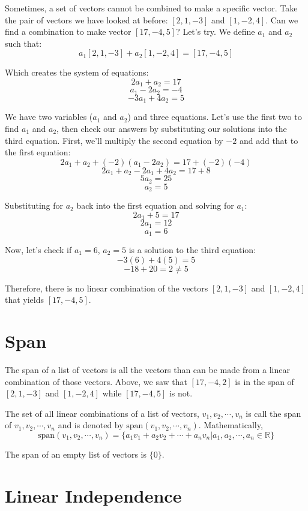 Sometimes, a set of vectors cannot be combined to make a specific vector. Take 
the pair of vectors we have looked at before: $\left[ 2, 1, -3 \right]$ and 
$\left[ 1, -2, 4 \right]$. Can we find a combination to make vector $\left[ 
17, -4, 5 \right]$? Let's try. We define $a_1$ and $a_2$ such that:
$$a_1 \left[ 2, 1, -3 \right] + a_2 \left[ 1, -2, 4 \right] = \left[ 17, -4, 5 
\right]$$

Which creates the system of equations:
$$2 a_1 + a_2 = 17$$
$$a_1 - 2 a_2 = -4$$
$$-3 a_1 + 4 a_2 = 5$$

We have two variables ($a_1$ and $a_2$) and three equations. Let's use the 
first two to find $a_1$ and $a_2$, then check our answers by substituting our 
solutions into the third equation. First, we'll multiply the second equation 
by $-2$ and add that to the first equation:
$$2 a_1 + a_2 + \left( -2 \right) \left( a_1 - 2 a_2 \right) = 17 + \left( -2 
\right) \left( -4 \right)$$
$$2 a_1 + a_2 - 2 a_1 + 4 a_2 = 17 + 8$$
$$5 a_2 = 25$$
$$a_2 = 5$$

Substituting for $a_2$ back into the first equation and solving for $a_1$:
$$2 a_1 + 5 = 17$$
$$2 a_1 = 12$$
$$a_1 = 6$$

Now, let's check if $a_1 = 6$, $a_2 = 5$ is a solution to the third equation:
$$-3 \left( 6 \right) + 4 \left( 5 \right) = 5$$
$$-18 + 20 = 2 \neq 5$$

Therefore, there is no linear combination of the vectors $\left[ 2, 1, -3 
\right]$ and $\left[ 1, -2, 4 \right]$ that yields $\left[ 17, -4, 5 \right]$.

\section{Span}
The span of a list of vectors is all the vectors than can be made from a 
linear combination of those vectors. Above, we saw that $\left[ 17, -4, 2 
\right]$ is in the span of $\left[ 2, 1, -3 \right]$ and $\left[1, -2, 4 
\right]$ while $\left[ 17, -4, 5 \right]$ is not. 

\begin{mdframed}[style = important, frametitle = {Span of a List of Vectors}]
The set of all linear combinations of a list of vectors, $v_1, v_2, \cdots, 
v_n$ is call the span of $v_1, v_2, \cdots, v_n$ and is denoted by $\text{span}
(v_1, v_2, \cdots, v_n)$. Mathematically, 
$$\text{span}(v_1, v_2, \cdots, v_n) = \{a_1 v_1 + a_2 v_2 + \cdots + a_n v_n 
| a_1, a_2, \cdots, a_n \in \mathbb{R} \}$$

The span of an empty list of vectors is $\{0\}$. 
\end{mdframed}



\section{Linear Independence}